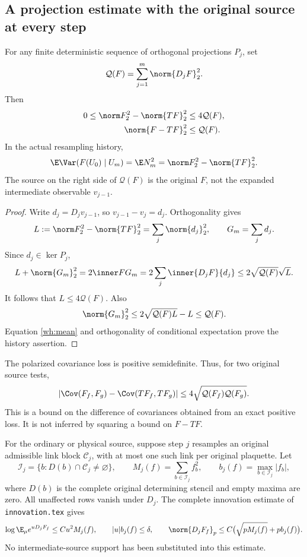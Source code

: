 \subsection{A projection estimate with the original source at every step}

\begin{lemma}
\label{wh:union}
For any finite deterministic sequence of orthogonal projections \(P_j\), set
\[
 \mathcal Q(F)=\sum_{j=1}^m\norm{D_jF}_2^2.
\]
Then
\begin{align}
 0\le\norm F_2^2-\norm{TF}_2^2&\le4\mathcal Q(F),
       \label{wh:loss}\\
 \norm{F-TF}_2^2&\le\mathcal Q(F).
       \label{wh:drift}
\end{align}
In the actual resampling history,
\[
 \E\Var(F(U_0)\mid U_m)=\E N_m^2
 =\norm F_2^2-\norm{TF}_2^2.
\]
The source on the right side of \(\mathcal Q(F)\) is the original \(F\), not the expanded intermediate observable \(v_{j-1}\).
\end{lemma}
\begin{proof}
Write \(d_j=D_jv_{j-1}\), so \(v_{j-1}-v_j=d_j\). Orthogonality gives
\[
 L:=\norm F_2^2-\norm{TF}_2^2=\sum_j\norm{d_j}_2^2,
 \qquad G_m=\sum_jd_j.
\]
Since \(d_j\in\ker P_j\),
\[
 L+\norm{G_m}_2^2
 =2\inner F{G_m}
 =2\sum_j\inner{D_jF}{d_j}
 \le2\sqrt{\mathcal Q(F)}\sqrt L.
\]
It follows that \(L\le4\mathcal Q(F)\). Also
\[
 \norm{G_m}_2^2
 \le2\sqrt{\mathcal Q(F)L}-L
 \le\mathcal Q(F).
\]
Equation \eqref{wh:mean} and orthogonality of conditional expectation prove the history assertion.
\end{proof}

The polarized covariance loss is positive semidefinite. Thus, for two original source tests,
\begin{equation}
 \left|\Cov(F_f,F_g)-\Cov(TF_f,TF_g)\right|
 \le4\sqrt{\mathcal Q(F_f)\mathcal Q(F_g)}.
 \label{wh:covloss}
\end{equation}
This is a bound on the difference of covariances obtained from an exact positive loss. It is not inferred by squaring a bound on \(F-TF\).

For the ordinary or physical source, suppose step \(j\) resamples an original admissible link block \(\mathcal C_j\), with at most one such link per original plaquette. Let
\[
 \mathcal I_j=\{b:D(b)\cap\mathcal C_j\ne\varnothing\},\qquad
 M_j(f)=\sum_{b\in\mathcal I_j}f_b^2,\qquad
 b_j(f)=\max_{b\in\mathcal I_j}|f_b|,
\]
where \(D(b)\) is the complete original determining stencil and empty maxima are zero. All unaffected rows vanish under \(D_j\). The complete innovation estimate of \texttt{innovation.tex} gives
\begin{equation}
 \log\E_\mu e^{uD_jF_f}\le Cu^2M_j(f),
 \qquad |u|b_j(f)\le\delta,
 \qquad
 \norm{D_jF_f}_p
 \le C\bigl(\sqrt{pM_j(f)}+p b_j(f)\bigr).
 \label{wh:originalinnovation}
\end{equation}
No intermediate-source support has been substituted into this estimate.


